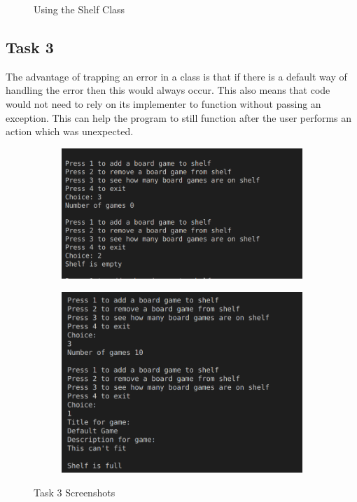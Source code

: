 \documentclass[11pt]{article}
\begin{document}
\begin{figure}[H]
\begin{subfigure}{.5\linewidth}
		\end{subfigure}
	\caption{Using the Shelf Class}
	\end{figure}

	\subsection{Task 3}
	The advantage of trapping an error in a class is that if there is a default way of handling the error then this would always occur. This also means that code would not need to rely on its implementer to function without passing an exception. This can help the program to still function after the user performs an action which was unexpected.
	\begin{figure} [H]
		\begin{subfigure}{0.6\linewidth}
			\centering
			\includegraphics{Task3empty}
		\end{subfigure}
		\begin{subfigure}{0.4\linewidth}
			\centering
			\includegraphics[scale=0.8]{Task3Full}
		\end{subfigure}
	\caption{Task 3 Screenshots}
	\end{figure}
	
\end{document}
